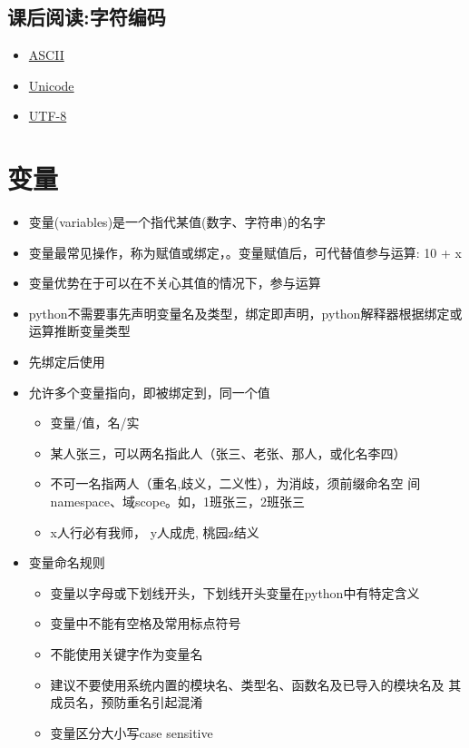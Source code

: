 \subsection{课后阅读:字符编码}
\begin{itemize}
\item \href{https://en.wikipedia.org/wiki/ASCII}{ASCII}
\item \href{https://www.unicode.org/standard/WhatIsUnicode.html}{Unicode}
\item \href{https://en.wikipedia.org/wiki/UTF-8}{UTF-8}
\end{itemize}

\section{变量}
\begin{itemize}
\item 变量(variables)是一个指代某值(数字、字符串)的名字
\item 变量最常见操作，称为赋值或绑定，。变量赋值后，可代替值参与运算: 10 + x
\item 变量优势在于可以在不关心其值的情况下，参与运算
\item python不需要事先声明变量名及类型，绑定即声明，python解释器根据绑定或运算推断变量类型
\item 先绑定后使用
\item 允许多个变量指向，即被绑定到，同一个值
  \begin{itemize}
  \item 变量/值，名/实
  \item 某人张三，可以两名指此人（张三、老张、那人，或化名李四）
  \item 不可一名指两人（重名,歧义，二义性），为消歧，须前缀命名空
    间namespace、域scope。如，1班张三，2班张三
  \item x人行必有我师， y人成虎, 桃园z结义
  \end{itemize}
\item 变量命名规则
  \begin{itemize}
  \item 变量以字母或下划线开头，下划线开头变量在python中有特定含义
  \item 变量中不能有空格及常用标点符号
  \item 不能使用关键字作为变量名
  \item 建议不要使用系统内置的模块名、类型名、函数名及已导入的模块名及
    其成员名，预防重名引起混淆
  \item 变量区分大小写case sensitive
  \end{itemize}
\end{itemize}

